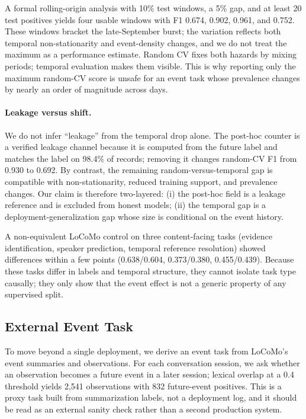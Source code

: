 \documentclass[sigconf,nonacm]{acmart}
\begin{document}
A formal rolling-origin analysis with 10\% test windows, a 5\% gap, and at least 20 test positives yields four usable windows with F1 0.674, 0.902, 0.961, and 0.752. These windows bracket the late-September burst; the variation reflects both temporal non-stationarity and event-density changes, and we do not treat the maximum as a performance estimate. Random CV fixes both hazards by mixing periods; temporal evaluation makes them visible. This is why reporting only the maximum random-CV score is unsafe for an event task whose prevalence changes by nearly an order of magnitude across days.

\paragraph{Leakage versus shift.}
We do not infer ``leakage'' from the temporal drop alone. The post-hoc counter is a verified leakage channel because it is computed from the future label and matches the label on 98.4\% of records; removing it changes random-CV F1 from 0.930 to 0.692. By contrast, the remaining random-versus-temporal gap is compatible with non-stationarity, reduced training support, and prevalence changes. Our claim is therefore two-layered: (i) the post-hoc field is a leakage reference and is excluded from honest models; (ii) the temporal gap is a deployment-generalization gap whose size is conditional on the event history.

A non-equivalent LoCoMo control on three content-facing tasks (evidence identification, speaker prediction, temporal reference resolution) showed differences within a few points (0.638/0.604, 0.373/0.380, 0.455/0.439). Because these tasks differ in labels and temporal structure, they cannot isolate task type causally; they only show that the event effect is not a generic property of any supervised split.

\subsection{External Event Task}
\label{sec:external-event}
To move beyond a single deployment, we derive an event task from LoCoMo's event summaries and observations. For each conversation session, we ask whether an observation becomes a future event in a later session; lexical overlap at a 0.4 threshold yields 2,541 observations with 832 future-event positives. This is a proxy task built from summarization labels, not a deployment log, and it should be read as an external sanity check rather than a second production system.
\end{document}
